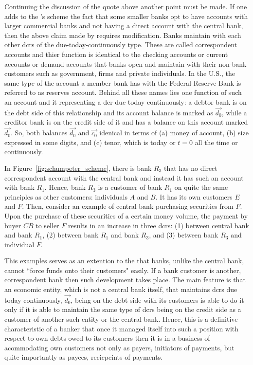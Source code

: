 Continuing the discussion of the quote above another point must be made. If one adds to the \citeauthor{schumpeter2014}'s scheme the fact that some smaller banks opt to have accounts with larger commercial banks and not having a direct account with the central bank, then the above claim made by \citeauthor{schumpeter2014} requires modification. Banks maintain with each other \acfp{dcr} of the due-today-continuously type. These are called correspondent accounts and thier function is identical to the checking accounts or current accounts or demand accounts that banks open and maintain with their non-bank customers such as government, firms and private individuals. In the U.S., the same type of the account a member bank has with the Federal Reserve Bank is referred to as reserves account. Behind all these names lies one function of such an account and it representing a \acf{dcr} due today continuously: a debtor bank is on the debt side of this relationship and its account balance is marked as $\overrightarrow{d_0}$, while a creditor bank is on the credit side of it and has a balance on this account marked $\overrightarrow{d_0}$. So, both balances $\overrightarrow{d_0}$ and $\overrightarrow{c_0}$ idenical in terms of (a) money of account, (b) size expressed in some digits, and (c) tenor, which is today or $t=0$ all the time or continuously.

In Figure~\ref{fig:schumpeter_scheme}, there is bank $R_3$ that has no direct correspondent account with the central bank and instead it has such an account with bank $R_1$. Hence, bank $R_3$ is a customer of bank $R_1$ on quite the same principles as other customers: individuals $A$ and $B$. It has its own customers $E$ and $F$. Then, consider an example of central bank purchasing securities from $F$. Upon the purchase of these securities of a certain money volume, the payment by buyer $CB$ to seller $F$ results in an increase in three \acfp{dcr}: (1) between central bank and bank $R_1$, (2) between bank $R_1$ and bank $R_3$, and (3) between bank $R_3$ and individual $F$. 

This examples serves as an extention to the \citeauthor{schumpeter2014} that banks, unlike the central bank, cannot ``force funds onto their customers" easily. If a bank customer is another, correspondent bank then such development takes place. The main feature is that an economic entity, which is not a central bank itself, that maintains \acfp{dcr} due today continuously, $\overrightarrow{d_0}$, being on the debt side with its customers is able to do it only if it is able to maintain the same type of \acp{dcr} being on the credit side as a customer of another such entity or the central bank. Hence, this is a definitive characteristic of a banker that once it managed itself into such a position with respect to own debts owed to its customers then it is in a business of acommodating own customers not only as payers, initiators of payments, but quite importantly as payees, reciepeints of payments.

